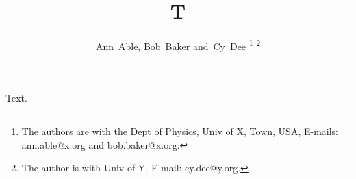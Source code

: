 \documentclass[10pt,journal,compsoc]{IEEEtran}
\begin{document}
\title{T}
\author{Ann~Able, Bob~Baker and~Cy~Dee
\thanks{The authors are with the Dept of Physics, Univ of X, Town, USA, E-mails: ann.able@x.org and bob.baker@x.org.}
\thanks{The author is with Univ of Y, E-mail: cy.dee@y.org.}}
\maketitle
Text.
\end{document}
